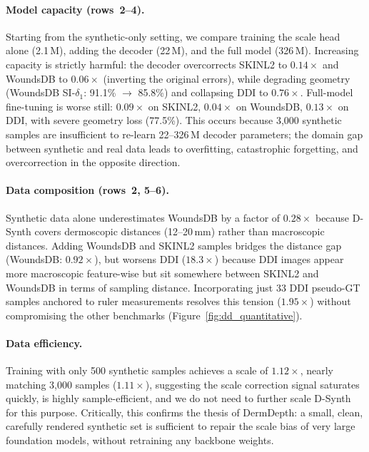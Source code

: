 \documentclass[11pt]{ucthesis}
\begin{document}
\paragraph{Model capacity (rows~2--4).}
Starting from the synthetic-only setting, we compare training the scale head alone (2.1\,M), adding the decoder (22\,M), and the full model (326\,M). Increasing capacity is strictly harmful: the decoder overcorrects SKINL2 to $0.14\times$ and WoundsDB to $0.06\times$ (inverting the original errors), while degrading geometry (WoundsDB SI-$\delta_1$: 91.1\% $\to$ 85.8\%) and collapsing DDI to $0.76\times$. Full-model fine-tuning is worse still: $0.09\times$ on SKINL2, $0.04\times$ on WoundsDB, $0.13\times$ on DDI, with severe geometry loss (77.5\%). This occurs because 3{,}000 synthetic samples are insufficient to re-learn 22--326\,M decoder parameters; the domain gap between synthetic and real data leads to overfitting, catastrophic forgetting, and overcorrection in the opposite direction.

\paragraph{Data composition (rows~2, 5--6).}
Synthetic data alone underestimates WoundsDB by a factor of $0.28\times$ because D-Synth covers dermoscopic distances (12--20\,mm) rather than macroscopic distances. Adding WoundsDB and SKINL2 samples bridges the distance gap (WoundsDB: $0.92\times$), but worsens DDI ($18.3\times$) because DDI images appear more macroscopic feature-wise but sit somewhere between SKINL2 and WoundsDB in terms of sampling distance. Incorporating just 33 DDI pseudo-GT samples anchored to ruler measurements resolves this tension ($1.95\times$) without compromising the other benchmarks (Figure~\ref{fig:dd_quantitative}).

\paragraph{Data efficiency.}
Training with only 500 synthetic samples achieves a scale of $1.12\times$, nearly matching 3{,}000 samples ($1.11\times$), suggesting the scale correction signal saturates quickly, is highly sample-efficient, and we do not need to further scale D-Synth for this purpose. Critically, this confirms the thesis of DermDepth: a small, clean, carefully rendered synthetic set is sufficient to repair the scale bias of very large foundation models, without retraining any backbone weights.
\end{document}
